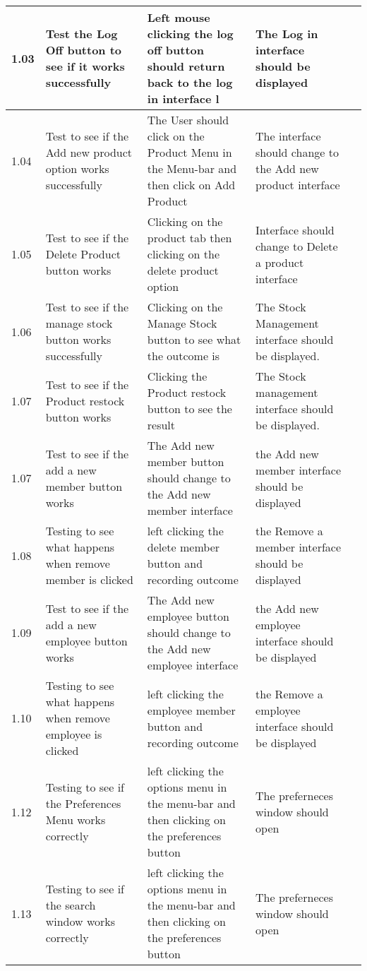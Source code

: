 \begin{flushleft}
\begin{longtable}{|p{1cm}|p{2.5cm}|p{2.5cm}|p{2cm}|p{2cm}|}
	1.03 & Test the Log Off button to see if it works successfully & Left mouse clicking the log off button should return back to the log in interface l & The Log in interface should be displayed &\\ \hline
	1.04 & Test to see if the Add new product option works successfully & The User should click on the Product Menu in the Menu-bar and then click on Add Product &  The interface should change to the Add new product interface& \\ \hline
	1.05 & Test to see if the Delete Product button works & Clicking on the product tab then clicking on the delete product option & Interface should change to Delete a product interface& \\ \hline
	1.06 & Test to see if the manage stock button works successfully & Clicking on the Manage Stock button to see what the outcome is & The Stock Management interface should be displayed. & \\ \hline
	\rowcolor{dark-grey}1.07 & Test to see if the Product restock button works & Clicking the Product restock button to see the result & The Stock management interface should be displayed. & \\ \hline
	1.07 & Test to see if the add a new member button works & The Add new member button should change to the Add new member interface & the Add new member interface should be displayed& \\ \hline
	1.08 & Testing to see what happens when remove member is clicked & left clicking the delete member button and recording outcome & the Remove a member interface should be displayed & \\ \hline
	1.09 & Test to see if the add a new employee button works & The Add new employee button should change to the Add new employee interface &  the Add new employee interface should be displayed& \\ \hline
	1.10 & Testing to see what happens when remove employee is clicked & left clicking the employee member button and recording outcome & the Remove a employee interface should be displayed & \\ \hline
	\rowcolor{light-grey}1.12 & Testing to see if the Preferences Menu works correctly & left clicking the options menu in the menu-bar and then clicking on the preferences button & The preferneces window should open & \\ \hline
	\rowcolor{light-grey}1.13 & Testing to see if the search window works correctly & left clicking the options menu in the menu-bar and then clicking on the preferences button & The preferneces window should open & \\ \hline

\end{longtable}
\end{flushleft}
